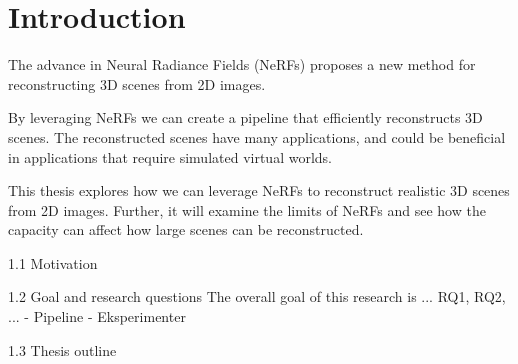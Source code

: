 \chapter{Introduction}

The advance in Neural Radiance Fields (NeRFs) proposes a new method for reconstructing 3D scenes from 2D images.

By leveraging NeRFs we can create a pipeline that efficiently reconstructs 3D scenes. The reconstructed scenes have many applications, and could be beneficial in applications that require simulated virtual worlds.

This thesis explores how we can leverage NeRFs to reconstruct realistic 3D scenes from 2D images. Further, it will examine the limits of NeRFs and see how the capacity can affect how large scenes can be reconstructed.



1.1 Motivation


1.2 Goal and research questions
The overall goal of this research is ...
RQ1, RQ2, ...
- Pipeline
- Eksperimenter

1.3 Thesis outline
